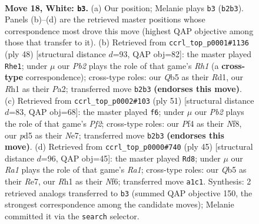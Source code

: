 \documentclass[11pt]{article}
\begin{document}
\clearpage

\begin{figure}[p]\centering
\begin{subfigure}{0.46\textwidth}\centering
\resizebox{\linewidth}{!}{%
\newchessgame
\chessboard[
  setfen={r1bq1k2/pp3pp1/n1n1p3/1Q1pP3/5P1r/P7/1P4PP/R3KNNR w KQ - 2 18},
  showmover=false,
  pgfstyle=straightmove, color=movearrow, markmove={b2-b3}
]}
\caption{}
\end{subfigure}\hfill
\begin{subfigure}{0.46\textwidth}\centering
\resizebox{\linewidth}{!}{%
\newchessgame
\chessboard[
  setfen={1r4k1/pq2bpp1/4p2p/2pn4/2Q1NP1P/1P6/P1P3P1/1K1R3R w - - 3 25},
  showmover=false,
  pgfstyle=straightmove, color=movearrow, markmove={h1-e1}
]}
\caption{}
\end{subfigure}
\\[4pt]
\begin{subfigure}{0.46\textwidth}\centering
\resizebox{\linewidth}{!}{%
\newchessgame
\chessboard[
  setfen={r3rnk1/1p2npp1/1p5p/1Pp5/P1q1P2N/R1B2PP1/1Q5P/5RK1 b - - 1 26},
  showmover=false,
  pgfstyle=straightmove, color=movearrow, markmove={f7-f6}
]}
\caption{}
\end{subfigure}\hfill
\begin{subfigure}{0.46\textwidth}\centering
\resizebox{\linewidth}{!}{%
\newchessgame
\chessboard[
  setfen={r5k1/ppq1rpp1/5n1p/4Nb2/2PR1P2/5B1P/PQ4P1/2R3K1 b - - 2 23},
  showmover=false,
  pgfstyle=straightmove, color=movearrow, markmove={a8-d8}
]}
\caption{}
\end{subfigure}
\caption{\textbf{Move 18, White: \texttt{b3}.} (a) Our position; Melanie plays \texttt{b3} (\texttt{b2b3}). Panels (b)--(d) are the retrieved master positions whose correspondence most drove this move (highest QAP objective among those that transfer to it). (b) Retrieved from \texttt{ccrl\_top\_p0001\#1136} (ply 48) [structural distance $d$=93, QAP obj=82]: the master played \texttt{Rhe1}; under $\mu$ our \emph{Pb2} plays the role of that game's \emph{Rh1} (a \textbf{cross-type} correspondence); cross-type roles: our \emph{Q}b5 as their \emph{R}d1, our \emph{R}h1 as their \emph{P}a2; transferred move \texttt{b2b3} \textbf{(endorses this move)}. (c) Retrieved from \texttt{ccrl\_top\_p0002\#103} (ply 51) [structural distance $d$=83, QAP obj=68]: the master played \texttt{f6}; under $\mu$ our \emph{Pb2} plays the role of that game's \emph{Pf2}; cross-type roles: our \emph{P}f4 as their \emph{N}f8, our \emph{p}d5 as their \emph{N}e7; transferred move \texttt{b2b3} \textbf{(endorses this move)}. (d) Retrieved from \texttt{ccrl\_top\_p0000\#740} (ply 45) [structural distance $d$=96, QAP obj=45]: the master played \texttt{Rd8}; under $\mu$ our \emph{Ra1} plays the role of that game's \emph{Ra1}; cross-type roles: our \emph{Q}b5 as their \emph{R}e7, our \emph{R}h1 as their \emph{N}f6; transferred move \texttt{a1c1}. Synthesis: 2 retrieved analogs transferred to \texttt{b3} (summed QAP objective 150, the strongest correspondence among the candidate moves); Melanie committed it via the \texttt{search} selector.}
\label{fig:thought-m34}
\end{figure}
\end{document}
